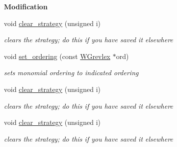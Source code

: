 \begin{Indent}\textbf{ Modification}\par
\begin{DoxyCompactItemize}
\item 
\mbox{\label{group___g_b_computation_ac006310b3318fa247fa9a415db495d06}} 
void \hyperlink{group___g_b_computation_ac006310b3318fa247fa9a415db495d06}{clear\+\_\+strategy} (unsigned i)
\begin{DoxyCompactList}\small\item\em clears the strategy; do this if you have saved it elsewhere \end{DoxyCompactList}\item 
\mbox{\label{group___g_b_computation_a727863db45a812f5dccc3f1d3be3a745}} 
void \hyperlink{group___g_b_computation_a727863db45a812f5dccc3f1d3be3a745}{set\+\_\+ordering} (const \hyperlink{group__orderinggroup_class_w_grevlex}{W\+Grevlex} $\ast$ord)
\begin{DoxyCompactList}\small\item\em sets monomial ordering to indicated ordering \end{DoxyCompactList}\item 
\mbox{\label{group___g_b_computation_ac006310b3318fa247fa9a415db495d06}} 
void \hyperlink{group___g_b_computation_ac006310b3318fa247fa9a415db495d06}{clear\+\_\+strategy} (unsigned i)
\begin{DoxyCompactList}\small\item\em clears the strategy; do this if you have saved it elsewhere \end{DoxyCompactList}\item 
\mbox{\label{group___g_b_computation_ac006310b3318fa247fa9a415db495d06}} 
void \hyperlink{group___g_b_computation_ac006310b3318fa247fa9a415db495d06}{clear\+\_\+strategy} (unsigned i)
\begin{DoxyCompactList}\small\item\em clears the strategy; do this if you have saved it elsewhere \end{DoxyCompactList}\end{DoxyCompactItemize}
\end{Indent}
